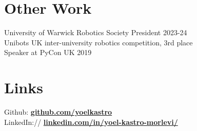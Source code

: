 \documentclass{deedy-resume-reversed}
\begin{document}
\begin{minipage}[t]{0.33\textwidth}


\section{Other Work}
University of Warwick Robotics Society President 2023-24 \\
Unibots UK inter-university robotics competition, 3rd place \\
Speaker at PyCon UK 2019 \\

\sectionsep


\section{Links}
Github: \href{https://github.com/}{\bf github.com/yoelkastro} \\
LinkedIn://  \href{https://www.linkedin.com/}{\bf linkedin.com/in/yoel-kastro-morlevi/}
\sectionsep

\end{minipage}
\end{document}
